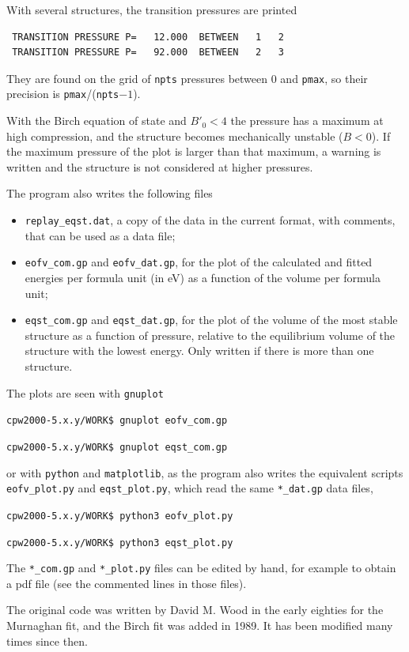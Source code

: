 \documentclass[11pt]{article}
\begin{document}
With several structures, the transition pressures are printed
\begin{verbatim}
 TRANSITION PRESSURE P=   12.000  BETWEEN   1   2
 TRANSITION PRESSURE P=   92.000  BETWEEN   2   3
\end{verbatim}
They are found on the grid of \texttt{npts} pressures between 0 and \texttt{pmax},
so their precision is \texttt{pmax}/(\texttt{npts}$-1$).

With the Birch equation of state and $B'_0 < 4$ the pressure has a maximum
at high compression, and the structure becomes mechanically unstable ($B<0$).
If the maximum pressure of the plot is larger than that maximum,
a warning is written and the structure is not considered at higher pressures.

The program also writes the following files
\begin{itemize}
\item[$\bullet$] \texttt{replay\_eqst.dat}, a copy of the data in the current format,
  with comments, that can be used as a data file;
\item[$\bullet$] \texttt{eofv\_com.gp} and \texttt{eofv\_dat.gp}, for the plot of
  the calculated and fitted energies per formula unit (in eV) as a function of the volume
  per formula unit;
\item[$\bullet$] \texttt{eqst\_com.gp} and \texttt{eqst\_dat.gp}, for the plot of the volume
  of the most stable structure as a function of pressure, relative to the equilibrium volume
  of the structure with the lowest energy.  Only written if there is more than one structure.
\end{itemize}
The plots are seen with \texttt{gnuplot}

\noindent\texttt{cpw2000-5.x.y/WORK\$ gnuplot eofv\_com.gp}

\noindent\texttt{cpw2000-5.x.y/WORK\$ gnuplot eqst\_com.gp}

or with \texttt{python} and \texttt{matplotlib}, as the program also writes
the equivalent scripts \texttt{eofv\_plot.py} and \texttt{eqst\_plot.py},
which read the same \texttt{*\_dat.gp} data files,

\noindent\texttt{cpw2000-5.x.y/WORK\$ python3 eofv\_plot.py}

\noindent\texttt{cpw2000-5.x.y/WORK\$ python3 eqst\_plot.py}

The \texttt{*\_com.gp} and \texttt{*\_plot.py} files can be edited by hand,
for example to obtain a pdf file (see the commented lines in those files).

The original code was written by David M. Wood in the early eighties
for the Murnaghan fit, and the Birch fit was added in 1989.
It has been modified many times since then.
\end{document}
